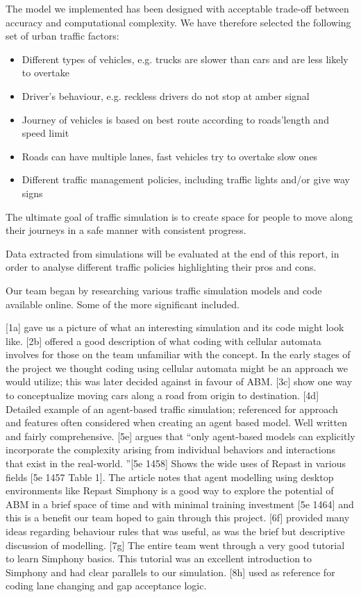 \documentclass[11pt]{article}
\begin{document}
The model we implemented has been designed with acceptable trade-off between accuracy and computational complexity. We have therefore selected the following set of urban traffic factors:
\begin{itemize}\itemsep0pt
\item Different types of vehicles, e.g. trucks are slower than cars and are less likely to overtake
\item Driver\textquoteright s behaviour, e.g. reckless drivers do not stop at amber signal
\item Journey of vehicles is based on best route according to roads\textquoteright length and speed limit
\item Roads can have multiple lanes, fast vehicles try to overtake slow ones
\item Different traffic management policies, including traffic lights and/or give way signs
\end{itemize}

The ultimate goal of traffic simulation is to create space for people to move along their journeys in a safe manner with consistent progress. 

Data extracted from simulations will be evaluated at the end of this report, in order to analyse different traffic policies highlighting their pros and cons.

Our team began by researching various traffic simulation models and code available online. Some of the more significant included. 

[1a] gave us a picture of what an interesting simulation and its code might look like. 
[2b] offered a good description of what coding with cellular automata involves for those on the team unfamiliar with the concept. In the early stages of the project we thought coding using cellular automata might be an approach we would utilize; this was later decided against in favour of ABM.
[3c] show one way to conceptualize moving cars along a road from origin to destination. 
[4d] Detailed example of an agent-based traffic simulation; referenced for approach and features often considered when creating an agent based model. Well written and fairly comprehensive.
[5e] argues that \textquotedblleft only agent-based models can explicitly incorporate the complexity arising from individual behaviors and interactions that exist in the real-world. \textquotedblright [5e 1458] Shows the wide uses of Repast in various fields [5e 1457 Table 1]. The article notes that agent modelling using desktop environments like Repast Simphony is a good way to explore the potential of ABM in a brief space of time and with minimal training investment [5e 1464] and this is a benefit our team hoped to gain through this project.
[6f] provided many ideas regarding behaviour rules that was useful, as was the brief but descriptive discussion of modelling.
[7g] The entire team went through a very good tutorial to learn Simphony basics. This tutorial was an excellent introduction to Simphony and had clear parallels to our simulation. 
[8h] used as reference for coding lane changing and gap acceptance logic.
\end{document}
